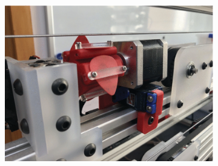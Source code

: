 \documentclass[12pt, a4paper, onecolumn]{IEEEtran}
\begin{document}
        \begin{figure}[!h]
            \centering
            \begin{subfigure}{0.3\textwidth}
                \includegraphics[width=\columnwidth]{mechbass_picking.png}
                \label{fig:mechbass_picking}
            \end{subfigure}
            \begin{subfigure}{0.2\textwidth}

\end{subfigure}
\end{figure}
\end{document}
